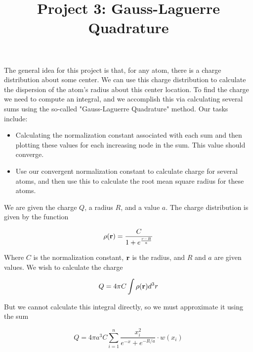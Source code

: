 \documentclass[11pt]{amsart}
\title{Project 3: Gauss-Laguerre Quadrature}
\begin{document}
\maketitle

The general idea for this project is that, for any atom, there is a charge distribution about some center.  We can use this charge distribution to calculate the dispersion of the atom's radius about this center location.  To find the charge we need to compute an integral, and we accomplish this via calculating several  sums using the so-called "Gauss-Laguerre Quadrature" method.  Our tasks include: 

\begin{itemize}
\item Calculating the normalization constant associated with each sum and then plotting these values for each increasing node in the sum.  This value should converge.
\item Use our convergent normalization constant to calculate charge for several atoms, and then use this to calculate the root mean square radius for these atoms.
\end{itemize}
\vspace{5 mm}

We are given the charge $Q$, a radius $R$, and a value $a$.  The charge distribution is given by the function

\begin{equation}
\rho(\textbf r) = \frac{C}{1+e^\frac{r-R}{a}}
\end{equation}

Where $C$ is the normalization constant, $\textbf r$ is the radius, and $R$ and $a$ are given values.  We wish to calculate the charge

\begin{equation}
Q = 4 \pi C \int \rho(\textbf r) d^3 r
\end{equation}

But we cannot calculate this integral directly, so we must approximate it using the sum

\begin{equation}
Q = 4 \pi a^3 C \sum \limits_{i=1}^n \frac{x_i^2}{e^{-x} + e^{-R/a}} \cdot w(x_i)
\end{equation}
\end{document}
